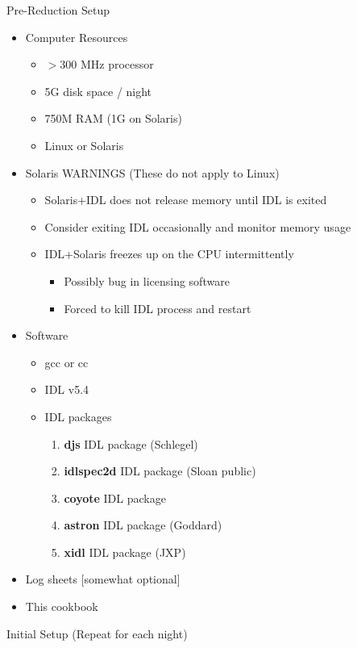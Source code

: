 \documentclass[11pt,letterpaper,dvips]{article}
\begin{document}
\begin{enumerate}
{\Large   \item Pre-Reduction Setup }
   \begin{itemize}
	\item Computer Resources
	\begin{itemize}
	  \item $>$300 MHz processor
	  \item 5G disk space / night
	  \item 750M RAM (1G on Solaris)
	  \item Linux or Solaris
	\end{itemize}
	\item Solaris WARNINGS (These do not apply to Linux)
	\begin{itemize}
	  \item Solaris+IDL does not release memory until IDL is exited
	  \item Consider exiting IDL occasionally and monitor memory usage
	  \item IDL+Solaris freezes up on the CPU intermittently
	  \begin{itemize}
		\item Possibly bug in licensing software
		\item Forced to kill IDL process and restart
	  \end{itemize}
	\end{itemize}
	\item Software
	\begin{itemize}
	  \item gcc or cc
	  \item IDL v5.4
	  \item IDL packages
		\begin{enumerate}
		  \item {\bf djs} IDL package  (Schlegel)
		  \item {\bf idlspec2d} IDL package  (Sloan public)
		  \item {\bf coyote} IDL package  
		  \item {\bf astron} IDL package   (Goddard)
		  \item {\bf xidl} IDL package   (JXP)
		\end{enumerate}
	\end{itemize}
	\item Log sheets [somewhat optional]
	\item This cookbook
   \end{itemize}

{\Large  \item Initial Setup (Repeat for each night) }


\end{enumerate}
\end{document}
